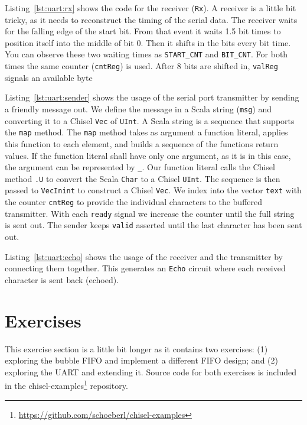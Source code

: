 \documentclass[%
    10pt,
    headinclude, footexclude,
    openright, %
    notitlepage,
    cleardoubleempty,
    headsepline,
    pointlessnumbers,
    bibtotoc, idxtotoc,
    ]{scrbook}
\newcommand{\code}[1]{{\small{\texttt{#1}}}}
\newcommand{\myref}[2]{\href{#1}{#2}}
\renewcommand{\myref}[2]{{#2}{\footnote{\url{#1}}}}
\begin{document}
Listing~\ref{lst:uart:rx} shows the code for the receiver (\code{Rx}).
A receiver is a little bit tricky, as it needs to reconstruct the timing of
the serial data. The receiver waits for the falling edge of the start bit.
From that event it waits 1.5 bit times to position itself into the middle
of bit 0. Then it shifts in the bits every bit time. You can observe these
two waiting times as \code{START\_CNT} and \code{BIT\_CNT}.
For both times the same counter (\code{cntReg}) is used.
After 8 bits are shifted in, \code{valReg} signals an available byte

Listing~\ref{lst:uart:sender} shows the usage of the serial port transmitter
by sending a friendly message out. We define the message in a Scala
string (\code{msg}) and converting it to a Chisel \code{Vec} of \code{UInt}.
A Scala string is a sequence that supports the \code{map} method.
The \code{map} method takes as argument a function literal, applies this function to
each element, and builds a sequence of the functions return values.
If the function literal shall have only one argument, as it is in this case, the
argument can be represented by \code{\_}. Our function literal calls
the Chisel method \code{.U} to convert the Scala \code{Char} to a Chisel
\code{UInt}. The sequence is then passed to \code{VecInint} to construct
a Chisel \code{Vec}. We index into the vector \code{text} with the counter
\code{cntReg} to provide the individual characters to the buffered transmitter.
With each \code{ready} signal we increase the counter until the full string
is sent out. The sender keeps \code{valid} asserted until the last character
has been sent out.

Listing~\ref{lst:uart:echo} shows the usage of the receiver and the transmitter
by connecting them together. This generates an \code{Echo} circuit where each
received character is sent back (echoed).

\section{Exercises}

This exercise section is a little bit longer as it contains two exercises:
(1) exploring the bubble FIFO and implement a different FIFO design;
and (2) exploring the UART and extending it.
Source code for both exercises is included in the
\myref{https://github.com/schoeberl/chisel-examples}{chisel-examples} repository.
\end{document}
